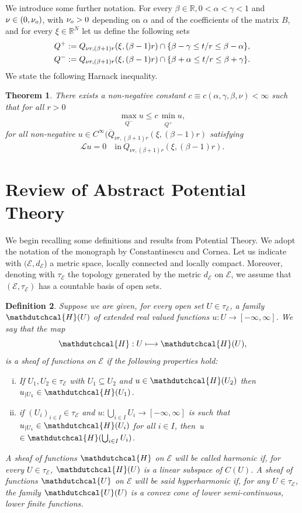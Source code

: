 \documentclass{amsart}
\newtheorem{thm}{Theorem}[section]
\newtheorem{defn}[thm]{Definition}
\numberwithin{equation}{section}
\def \Lc{{\mathcal{L}}}
\def \r{{\mathbb{R}}}
\def \Hd{{\mathdutchcal{H}}}
\def \Ec{{\mathcal{E}}}
\def \Ud{{\mathdutchcal{U}}}
\begin{document}
{We introduce some further notation. For every $\beta \in \r, 0<\alpha<\gamma<1$ and $\nu \in (0,\nu_{\rm o})$, with $\nu_{\rm o}>0$ depending on $\alpha$ and of the coefficients of the matrix $B$, and for every $\xi \in \r^N$ let us define the following sets
\begin{align*}
	Q^+&:= {Q}_{\nu r,(\beta +1)r}(\xi,(\beta -1)r) \cap \{\beta -\gamma \leq t/r \leq \beta - \alpha\},\notag \\
	Q^-  &:= {Q}_{\nu r,(\beta +1)r}(\xi,(\beta -1)r) \cap \{\beta + \alpha \leq t/r \leq \beta + \gamma\}\notag.
\end{align*}
We state the following Harnack inequality.
\begin{thm}	\label{harnack} 
	There exists a non-negative constant $c\equiv c(\alpha,\gamma,\beta,\nu)<\infty$ such that for all $r>0$ 
	\[
		\max_{\overline{Q^-}}u \leq c\,\min_{\overline{Q^+}}u,
	\]
	for all non-negative $u \in {C}^\infty(\overline{Q}_{\nu r,(\beta +1)r}(\xi,(\beta -1)r)$ satisfying 
    \[
    \Lc u = 0 \quad \text{in} \ {Q}_{\nu r,(\beta +1)r}(\xi,(\beta -1)r).
    \]
\end{thm}


\section{Review of Abstract Potential Theory}\label{sec:3}
We begin recalling some definitions and results from Potential Theory. We adopt the notation of the monograph \cite{CC72} by Constantinescu and Cornea. Let us indicate with $(\Ec, d_{\Ec}$) a metric space, locally connected and locally compact. Moreover, denoting with $\tau_{\Ec}$ the topology generated by the metric $d_{\Ec}$ on $\Ec$, we assume that $(\Ec,\tau_{\Ec})$ has a countable basis of open sets.

\begin{defn}
	Suppose we are given, for every open set $U \in \tau_{\Ec}$, a family $\Hd(U)$ of extended real valued functions $u : U \rightarrow [- \infty, \infty]$. We say that the map
	$$
    \Hd: U \longmapsto \Hd(U),
	$$
	is a \textup{sheaf of functions} on $\Ec$ if the following properties hold:
	\begin{enumerate}[(i)]
		\item If $U_1 , U_2 \in \tau_{\Ec}$  with $ U_1 \subseteq U_2$ and  $u \in \Hd(U_2)$  then $u_{|U_1} \in \Hd(U_1)$.
		\item if $(U_{i})_{i \in {I}} \in \tau_{\Ec}$  and $u: \bigcup_{i\in {I}}U_{i} \rightarrow [-\infty, \infty]$ is such that~$u_{|U_{i}} \in \Hd(U_{i})$ for all $i \in {I}$, then~u $\in \Hd(\bigcup_{i \in {I}}U_{i})$.  
	\end{enumerate}
A sheaf of functions $\Hd$ on $\Ec$ will be called \textup{harmonic} if,
for every $U \in \tau_{\Ec}$, $\Hd(U)$ is a linear subspace of ${C}(U)$.
A sheaf of functions $\Ud$ on $\Ec$ will be said  \textup{hyperharmonic} if, for any  $U \in \tau_{\Ec}$, the family $\Ud(U)$ is a convex cone of lower semi-continuous, lower finite functions.
\end{defn}

}
\end{document}
